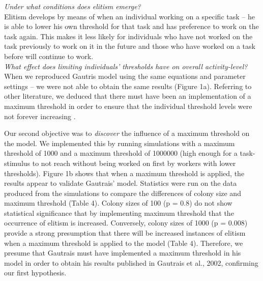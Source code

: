 \documentclass[a4paper]{article}
\begin{document}
\noindent\textit{Under what conditions does elitism emerge?}\\
\indent Elitism develops by means of when an individual working on a specific task – he is able to lower his own threshold for that task and has preference to work on the task again.  This makes it less likely for individuals who have not worked on the task previously to work on it in the future and those who have worked on a task before will continue to work.\\  

\noindent\textit{What effect does limiting individuals' thresholds have on overall activity-level?}\\
\indent When we reproduced Gautris model using the same equations and parameter settings – we were not able to obtain the same results (Figure 1a). Referring to other literature, we deduced that there must have been an implementation of a maximum threshold in order to ensure that the individual threshold levels were not forever increasing \cite{evolution}.

Our second objective was to \textit{discover} the influence of a maximum threshold on the model.  We implemented this by running simulations with a maximum threshold of 1000 and a maximum threshold of 1000000 (high enough for a task-stimulus to not reach without being worked on first by workers with lower thresholds).  Figure 1b shows that when a maximum threshold is applied, the results appear to validate Gautrais’ model.   Statistics were run on the data produced from the simulations to compare the differences of colony size and maximum threshold (Table 4).  Colony sizes of 100 (p = 0.8) do not show statistical significance that by implementing maximum threshold that the occurrence of elitism is increased.  Conversely, colony sizes of 1000 (p = 0.008) provide a strong presumption that there will be increased instances of elitism when a maximum threshold is applied to the model (Table 4).  Therefore, we presume that Gautrais must have implemented a maximum threshold in his model in order to obtain his results published in Gautrais et al., 2002, confirming our first hypothesis. \\   
\end{document}
